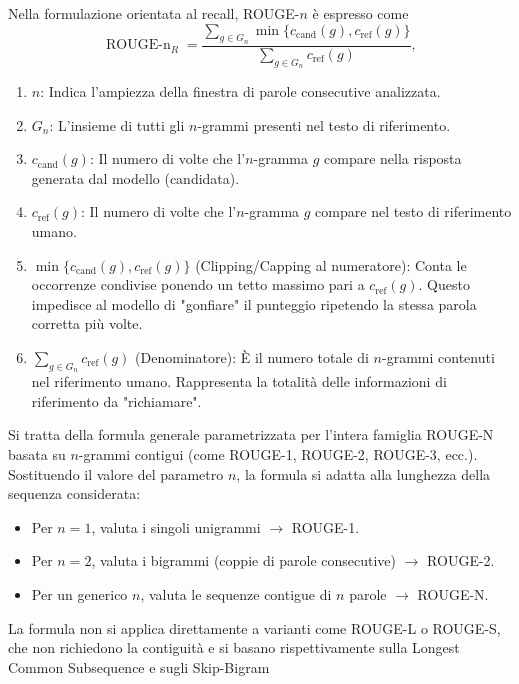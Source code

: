 Nella formulazione orientata al recall, ROUGE-$n$ è espresso come
\begin{equation}
\operatorname{ROUGE\text{-}n}_{R}
=\frac{\sum_{g\in G_n}\min\{c_{\mathrm{cand}}(g),c_{\mathrm{ref}}(g)\}}
{\sum_{g\in G_n}c_{\mathrm{ref}}(g)},
\end{equation}
\begin{enumerate}
    \item $n$: Indica l'ampiezza della finestra di parole consecutive analizzata.
    \item $G_n$: L'insieme di tutti gli $n$-grammi presenti nel testo di riferimento.
    \item $c_{\text{cand}}(g)$: Il numero di volte che l'$n$-gramma $g$ compare nella risposta generata dal modello (candidata).
    \item $c_{\text{ref}}(g)$: Il numero di volte che l'$n$-gramma $g$ compare nel testo di riferimento umano.
    \item $\min\{c_{\text{cand}}(g), c_{\text{ref}}(g)\}$ (Clipping/Capping al numeratore): Conta le occorrenze condivise ponendo un tetto massimo pari a $c_{\text{ref}}(g)$. Questo impedisce al modello di "gonfiare" il punteggio ripetendo la stessa parola corretta più volte.
    \item $\sum_{g \in G_n} c_{\text{ref}}(g)$ (Denominatore): È il numero totale di $n$-grammi contenuti nel riferimento umano. Rappresenta la totalità delle informazioni di riferimento da "richiamare".
\end{enumerate}


Si tratta della formula generale parametrizzata per l'intera famiglia ROUGE-N basata su $n$-grammi contigui (come ROUGE-1, ROUGE-2, ROUGE-3, ecc.).
Sostituendo il valore del parametro $n$, la formula si adatta alla lunghezza della sequenza considerata:
\begin{itemize}
    \item Per $n = 1$, valuta i singoli unigrammi $\rightarrow$ ROUGE-1.  
    \item Per $n = 2$, valuta i bigrammi (coppie di parole consecutive) $\rightarrow$ ROUGE-2. 
    \item Per un generico $n$, valuta le sequenze contigue di $n$ parole $\rightarrow$ ROUGE-N.
\end{itemize}
\begin{observation}{}
    La formula non si applica direttamente a varianti come ROUGE-L o ROUGE-S, che non richiedono la contiguità e si basano rispettivamente sulla Longest Common Subsequence e sugli Skip-Bigram
\end{observation}


